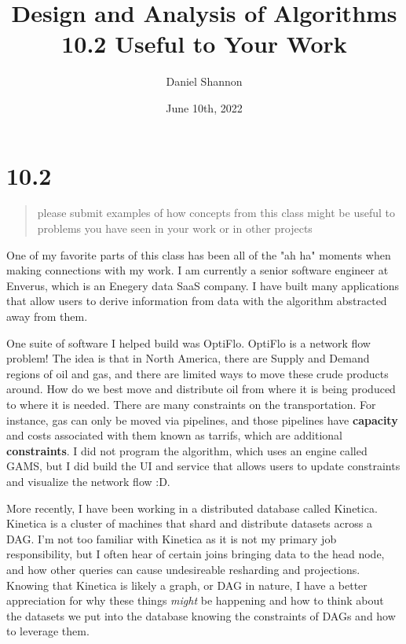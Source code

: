 \documentclass[12pt, letterpaper, twoside]{article}
\title{%
Design and Analysis of Algorithms\\
\large 10.2 Useful to Your Work
}
\author{Daniel Shannon}
\date{June 10th, 2022}
\begin{document}
\begin{titlepage}
\maketitle
\end{titlepage}
\section*{10.2}
\begin{quote}
    please submit examples of how concepts from this class might be useful to problems you have seen in your work or in other projects
\end{quote}

One of my favorite parts of this class has been all of the "ah ha" moments when making connections with my work.
I am currently a senior software engineer at Enverus, which is an Enegery data SaaS company. I have built many applications that 
allow users to derive information from data with the algorithm abstracted away from them.

One suite of software I helped build was OptiFlo. OptiFlo is a network flow problem! The idea is that in North America,
there are Supply and Demand regions of oil and gas, and there are limited ways to move these crude products around.
How do we best move and distribute oil from where it is being produced to where it is needed. There are many constraints
on the transportation. For instance, gas can only be moved via pipelines, and those pipelines have \textbf{capacity} and costs
associated with them known as tarrifs, which are additional \textbf{constraints}. I did not program the algorithm, which uses an engine called GAMS,
but I did build the UI and service that allows users to update constraints and visualize the network flow :D.

More recently, I have been working in a distributed database called Kinetica. Kinetica is a cluster of machines that shard and distribute
datasets across a DAG. I'm not too familiar with Kinetica as it is not my primary job responsibility, but I often hear of certain joins
bringing data to the head node, and how other queries can cause undesireable resharding and projections. Knowing that Kinetica is likely a graph, or DAG in nature,
I have a better appreciation for why these things \emph{might} be happening and how to think about the datasets we put into the database
knowing the constraints of DAGs and how to leverage them.
\end{document}
